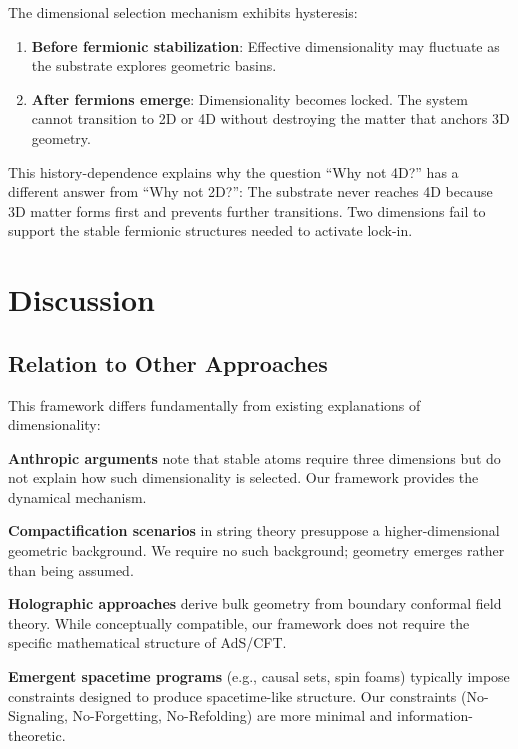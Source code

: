 \documentclass[11pt]{article}
\begin{document}
The dimensional selection mechanism exhibits hysteresis:

\begin{enumerate}
\item \textbf{Before fermionic stabilization}: Effective dimensionality may fluctuate as the substrate explores geometric basins.
\item \textbf{After fermions emerge}: Dimensionality becomes locked. The system cannot transition to 2D or 4D without destroying the matter that anchors 3D geometry.
\end{enumerate}

This history-dependence explains why the question ``Why not 4D?'' has a different answer from ``Why not 2D?'': The substrate never reaches 4D because 3D matter forms first and prevents further transitions. Two dimensions fail to support the stable fermionic structures needed to activate lock-in.

\section{Discussion}

\subsection{Relation to Other Approaches}

This framework differs fundamentally from existing explanations of dimensionality:

\textbf{Anthropic arguments} note that stable atoms require three dimensions but do not explain how such dimensionality is selected. Our framework provides the dynamical mechanism.

\textbf{Compactification scenarios} in string theory presuppose a higher-dimensional geometric background. We require no such background; geometry emerges rather than being assumed.

\textbf{Holographic approaches} derive bulk geometry from boundary conformal field theory. While conceptually compatible, our framework does not require the specific mathematical structure of AdS/CFT.

\textbf{Emergent spacetime programs} (e.g., causal sets, spin foams) typically impose constraints designed to produce spacetime-like structure. Our constraints (No-Signaling, No-Forgetting, No-Refolding) are more minimal and information-theoretic.
\end{document}

